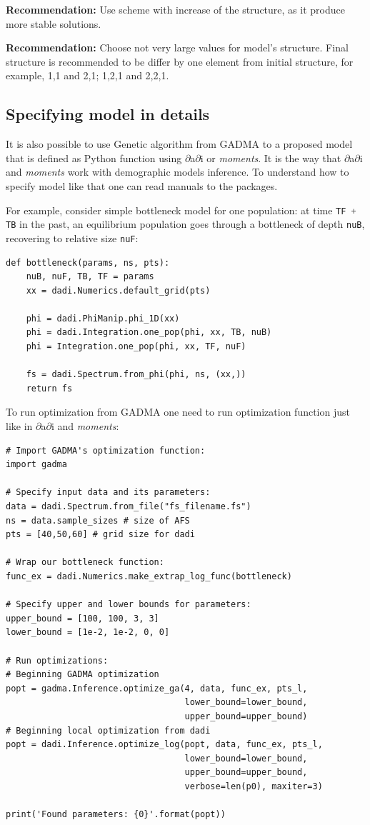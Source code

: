 \documentclass[12pt]{article}
\makeatletter
\newcommand{\dadi}{$\partial$a$\partial$i\xspace}
\newcommand{\moments}{\textit{moments}\xspace}
\newcommand{\py}[1]{\lstinline[language=Python, showstringspaces=False]@#1@}
\makeatother
\begin{document}
\textbf{Recommendation: } Use scheme with increase of the structure, as it produce more stable solutions.

\textbf{Recommendation: } Choose not very large values for model's structure. Final structure is recommended to be differ by one element from initial structure, for example, 1,1 and 2,1; 1,2,1 and  2,2,1.


\subsection{Specifying model in details}
\label{sec:spec-model-in-det}

It is also possible to use Genetic algorithm from GADMA to a proposed model that is defined as Python function using \dadi or \moments. It is the way that \dadi and \moments work with demographic models inference. To understand how to specify model like that one can read manuals to the packages. 

For example, consider simple bottleneck model for one population: at time \py{TF + TB} in the past, an equilibrium population goes through a bottleneck of depth \py{nuB}, recovering to relative size \py{nuF}:

\begin{lstlisting}
def bottleneck(params, ns, pts):
    nuB, nuF, TB, TF = params
    xx = dadi.Numerics.default_grid(pts)
    
    phi = dadi.PhiManip.phi_1D(xx)
    phi = dadi.Integration.one_pop(phi, xx, TB, nuB) 
    phi = Integration.one_pop(phi, xx, TF, nuF)
    
    fs = dadi.Spectrum.from_phi(phi, ns, (xx,)) 
    return fs
\end{lstlisting}

To run optimization from GADMA one need to run optimization function just like in \dadi and \moments:

\begin{lstlisting}
# Import GADMA's optimization function:
import gadma

# Specify input data and its parameters:
data = dadi.Spectrum.from_file("fs_filename.fs")
ns = data.sample_sizes # size of AFS
pts = [40,50,60] # grid size for dadi

# Wrap our bottleneck function:
func_ex = dadi.Numerics.make_extrap_log_func(bottleneck)

# Specify upper and lower bounds for parameters:
upper_bound = [100, 100, 3, 3]
lower_bound = [1e-2, 1e-2, 0, 0]

# Run optimizations:
# Beginning GADMA optimization
popt = gadma.Inference.optimize_ga(4, data, func_ex, pts_l,
                                   lower_bound=lower_bound,
                                   upper_bound=upper_bound)
# Beginning local optimization from dadi
popt = dadi.Inference.optimize_log(popt, data, func_ex, pts_l,
                                   lower_bound=lower_bound,
                                   upper_bound=upper_bound,
                                   verbose=len(p0), maxiter=3)

print('Found parameters: {0}'.format(popt))
\end{lstlisting}
\end{document}
